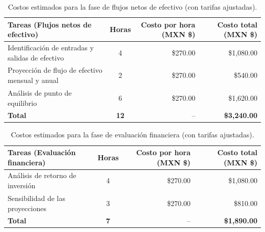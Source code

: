 \begin{table}[H]
	\centering
	\renewcommand{\arraystretch}{1.6}
	\setlength{\tabcolsep}{10pt}
	\Huge
	\begin{adjustbox}{max width=\textwidth}
		\begin{tabular}{|p{9.5cm}|c|r|r|}
			\hline
			\textbf{Tareas (Flujos netos de efectivo)} & \textbf{Horas} & \textbf{Costo por hora (MXN \$)} & \textbf{Costo total (MXN \$)} \\ \hline
			Identificación de entradas y salidas de efectivo & 4 & \$270.00 & \$1,080.00 \\ \hline
			Proyección de flujo de efectivo mensual y anual & 2 & \$270.00 & \$540.00 \\ \hline
			Análisis de punto de equilibrio & 6 & \$270.00 & \$1,620.00 \\ \hline
			\textbf{Total} & \textbf{12} & -- & \textbf{\$3,240.00} \\ \hline
		\end{tabular}
	\end{adjustbox}
	\caption{Costos estimados para la fase de flujos netos de efectivo (con tarifas ajustadas).}
	\label{tab:costos_flujos_efectivo}
\end{table}

\begin{table}[H]
	\centering
	\renewcommand{\arraystretch}{1.6}
	\setlength{\tabcolsep}{10pt}
	\Huge
	\begin{adjustbox}{max width=\textwidth}
		\begin{tabular}{|p{9.5cm}|c|r|r|}
			\hline
			\textbf{Tareas (Evaluación financiera)} & \textbf{Horas} & \textbf{Costo por hora (MXN \$)} & \textbf{Costo total (MXN \$)} \\ \hline
			Análisis de retorno de inversión & 4 & \$270.00 & \$1,080.00 \\ \hline
			Sensibilidad de las proyecciones & 3 & \$270.00 & \$810.00 \\ \hline
			\textbf{Total} & \textbf{7} & -- & \textbf{\$1,890.00} \\ \hline
		\end{tabular}
	\end{adjustbox}
	\caption{Costos estimados para la fase de evaluación financiera (con tarifas ajustadas).}
	\label{tab:costos_evaluacion_financiera}
\end{table}

